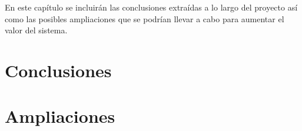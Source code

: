 En este capítulo se incluirán las conclusiones extraídas a lo largo del proyecto así como las posibles ampliaciones que se podrían llevar a cabo para aumentar el valor del sistema.

\section{Conclusiones}
\label{conclusiones}


\section{Ampliaciones}
\label{ampliaciones}
